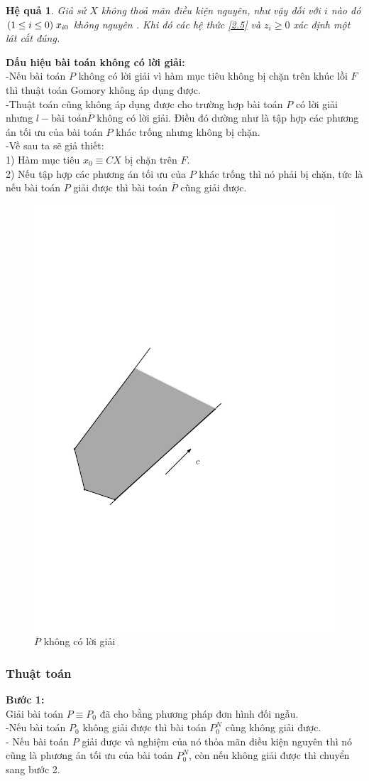 \documentclass[12pt,a4paper]{report}
\newtheorem{hq}{Hệ quả}
\begin{document}
    \begin{hq}
        Giả sử $X$ không thoả mãn điều kiện nguyên, như vậy đối 
với $i$ nào đó $(1\le i \le 0) \hspace{0.1cm} x_{i0}$ không nguyên . Khi đó các hệ thức \eqref{2.5}  và $z_i \ge 0$ xác định một lát cắt đúng.
    \end{hq} 
    
    \textbf{Dấu hiệu bài toán không có lời giải:}\\
    -Nếu bài toán $P$ không có lời giải vì hàm mục tiêu không bị chặn trên khúc lồi $F$ thì thuật toán Gomory không áp dụng được.\\
-Thuật toán cũng không áp dụng được cho trường hợp bài toán $P$ có lời giải nhưng $l-\text{bài toán} \overline{P}$ không có lời giải. Điều đó dường như là tập hợp các phương án tối ưu của bài toán $P$ khác trống nhưng không bị chặn.\\
-Về sau ta sẽ giả thiết:\\
1) Hàm mục tiêu $x_0\equiv CX$ bị chặn trên $F$.\\
2) Nếu tập hợp các phương án tối ưu của $P$ khác trống thì nó phải bị chặn, tức là nếu bài toán $P$ giải được thì bài toán $\overline{P}$ cũng giải 
được.\\

\begin{figure}[h]
\centering
\includegraphics[width=0.3\linewidth]{anh3.pdf}
\caption{$\overline{P}$ không có lời giải}
\end{figure}
\subsubsection{ Thuật toán}

\textbf{Bước 1:}\\
Giải bài toán $P\equiv P_0$ đã cho bằng phương pháp đơn hình đối ngẫu.\\
-Nếu bài toán $P_0$ không giải được thì bài toán $P_0^N$ cũng không giải được.\\
- Nếu bài toán $P$ giải được và nghiệm của nó thỏa mãn điều kiện nguyên thì nó cũng là phương án tối ưu của bài toán $P^N_0$, còn nếu không giải được thì chuyển sang bước 2.\\
\end{document}
